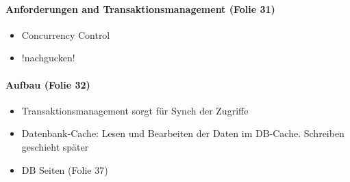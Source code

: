 \documentclass[ngerman]{scrartcl}
\begin{document}
\paragraph*{Anforderungen and Transaktionsmanagement (Folie 31)}
\begin{itemize}
  \item Concurrency Control
  \item !nachgucken!
\end{itemize}

\paragraph*{Aufbau (Folie 32)}
\begin{itemize}
  \item Transaktionsmanagement sorgt für Synch der Zugriffe
  \item Datenbank-Cache: Lesen und Bearbeiten der Daten im DB-Cache. Schreiben geschieht später
  \item DB Seiten (Folie 37)
\end{itemize}
\end{document}
